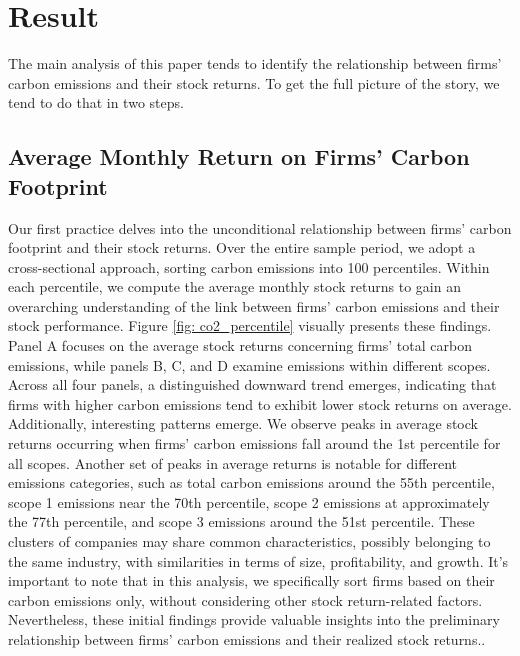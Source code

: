 \documentclass[12pt]{article}
\begin{document}
\clearpage
\section{Result} \label{sec:result}




The main analysis of this paper tends to identify the relationship between firms' carbon emissions and their stock returns. To get the full picture of the story, we tend to do that in two steps. 
\subsection{Average Monthly Return on Firms' Carbon Footprint}

Our first practice delves into the unconditional relationship between firms' carbon footprint and their stock returns. Over the entire sample period, we adopt a cross-sectional approach, sorting carbon emissions into 100 percentiles. Within each percentile, we compute the average monthly stock returns to gain an overarching understanding of the link between firms' carbon emissions and their stock performance. Figure \ref{fig: co2_percentile} visually presents these findings. Panel A focuses on the average stock returns concerning firms' total carbon emissions, while panels B, C, and D examine emissions within different scopes. Across all four panels, a distinguished downward trend emerges, indicating that firms with higher carbon emissions tend to exhibit lower stock returns on average. Additionally, interesting patterns emerge. We observe peaks in average stock returns occurring when firms' carbon emissions fall around the 1st percentile for all scopes. Another set of peaks in average returns is notable for different emissions categories, such as total carbon emissions around the 55th percentile, scope 1 emissions near the 70th percentile, scope 2 emissions at approximately the 77th percentile, and scope 3 emissions around the 51st percentile. These clusters of companies may share common characteristics, possibly belonging to the same industry, with similarities in terms of size, profitability, and growth. It's important to note that in this analysis, we specifically sort firms based on their carbon emissions only, without considering other stock return-related factors. Nevertheless, these initial findings provide valuable insights into the preliminary relationship between firms' carbon emissions and their realized stock returns..
\end{document}
